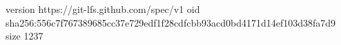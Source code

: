 version https://git-lfs.github.com/spec/v1
oid sha256:556c7f767389685cc37e729edf1f28cdfcbb93acd0bd4171d14ef103d38fa7d9
size 1237
